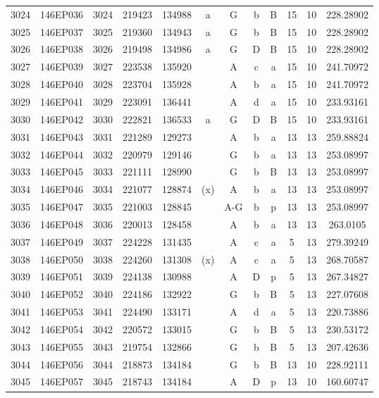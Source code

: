\begin{tabular}{|*{12}{c|}}
3024 & 146EP036 & 3024 & 219423 & 134988 & a & G & b & B & 15 & 10 & 228.28902 \\ 
3025 & 146EP037 & 3025 & 219360 & 134943 & a & G & b & B & 15 & 10 & 228.28902 \\ 
3026 & 146EP038 & 3026 & 219498 & 134986 & a & G & D & B & 15 & 10 & 228.28902 \\ 
3027 & 146EP039 & 3027 & 223538 & 135920 &  & A & c & a & 15 & 10 & 241.70972 \\ 
3028 & 146EP040 & 3028 & 223704 & 135928 &  & A & b & a & 15 & 10 & 241.70972 \\ 
3029 & 146EP041 & 3029 & 223091 & 136441 &  & A & d & a & 15 & 10 & 233.93161 \\ 
3030 & 146EP042 & 3030 & 222821 & 136533 & a & G & D & B & 15 & 10 & 233.93161 \\ 
3031 & 146EP043 & 3031 & 221289 & 129273 &  & A & b & a & 13 & 13 & 259.88824 \\ 
3032 & 146EP044 & 3032 & 220979 & 129146 &  & G & b & a & 13 & 13 & 253.08997 \\ 
3033 & 146EP045 & 3033 & 221111 & 128990 &  & G & b & B & 13 & 13 & 253.08997 \\ 
3034 & 146EP046 & 3034 & 221077 & 128874 & (x) & A & b & a & 13 & 13 & 253.08997 \\ 
3035 & 146EP047 & 3035 & 221003 & 128845 &  & A-G & b & p & 13 & 13 & 253.08997 \\ 
3036 & 146EP048 & 3036 & 220013 & 128458 &  & A & b & a & 13 & 13 & 263.0105 \\ 
3037 & 146EP049 & 3037 & 224228 & 131435 &  & A & c & a & 5 & 13 & 279.39249 \\ 
3038 & 146EP050 & 3038 & 224260 & 131308 & (x) & A & c & a & 5 & 13 & 268.70587 \\ 
3039 & 146EP051 & 3039 & 224138 & 130988 &  & A & D & p & 5 & 13 & 267.34827 \\ 
3040 & 146EP052 & 3040 & 224186 & 132922 &  & G & b & B & 5 & 13 & 227.07608 \\ 
3041 & 146EP053 & 3041 & 224490 & 133171 &  & A & d & a & 5 & 13 & 220.73886 \\ 
3042 & 146EP054 & 3042 & 220572 & 133015 &  & G & b & B & 5 & 13 & 230.53172 \\ 
3043 & 146EP055 & 3043 & 219754 & 132866 &  & G & b & B & 5 & 13 & 207.42636 \\ 
3044 & 146EP056 & 3044 & 218873 & 134184 &  & G & b & B & 13 & 10 & 228.92111 \\ 
3045 & 146EP057 & 3045 & 218743 & 134184 &  & A & D & p & 13 & 10 & 160.60747 \\ 

\end{tabular}
